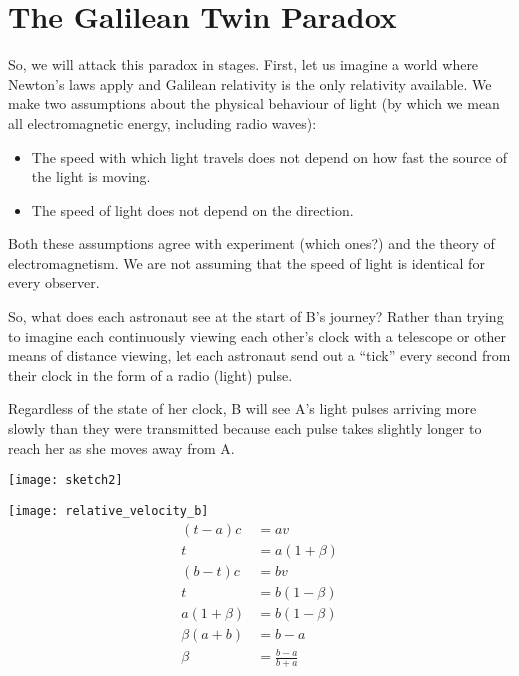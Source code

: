 \documentclass[a4paper]{report}
\begin{document}
\section*{The Galilean Twin Paradox}

So, we will attack this paradox in stages. First, let us imagine a world where Newton's laws apply and Galilean relativity is the only relativity available. We make two assumptions about the physical behaviour of light (by which we mean all electromagnetic energy, including radio waves):
\begin{itemize}
\item The speed with which light travels does not depend on how fast the source of the light is moving.
\item The speed of light does not depend on the direction.
\end{itemize}

Both these assumptions agree with experiment (which ones?) and the theory of electromagnetism. We are not assuming that the speed of light is identical for every observer.



So, what does each astronaut see at the start of B's journey? Rather than trying to imagine each continuously viewing each other's clock with a telescope or other means of distance viewing, let each astronaut send out a ``tick'' every second from their clock in the form of a radio (light) pulse.

Regardless of the state of her clock, B will see A's light pulses arriving more slowly than they were transmitted because each pulse takes slightly longer to reach her as she moves away from A.

\texttt{[image: sketch2]}


\texttt{[image: relative\_velocity\_b]}
\begin{align*}
  (t - a) c & =  av \\
  t & = a(1 + \beta) \\
(b - t)c & =  bv \\
t & = b(1 - \beta) \\
a(1 + \beta) & = b(1 - \beta) \\
\beta(a + b) & = b - a \\
\beta & = \frac{b - a}{b + a} 
\end{align*}
\end{document}
